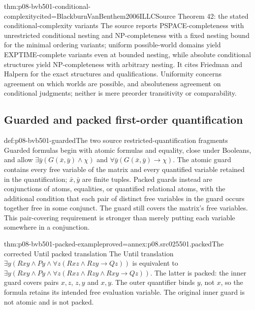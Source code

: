 \begin{hbtheorem}{thm:p08-bvb501-conditional-complexity}{cited=BlackburnVanBenthem2006ILLC}{Source Theorem 42: the stated conditional-complexity variants}
The source reports PSPACE-completeness with unrestricted conditional
nesting and NP-completeness with a fixed nesting bound for the minimal
ordering variants; uniform possible-world domains yield EXPTIME-complete
variants even at bounded nesting, while absolute conditional structures
yield NP-completeness with arbitrary nesting. It cites Friedman and Halpern
for the exact structures and qualifications. Uniformity concerns agreement
on which worlds are possible, and absoluteness agreement on conditional
judgments; neither is mere preorder transitivity or comparability.
\end{hbtheorem}

\subsection{Guarded and packed first-order quantification}
\label{sec:p08-bvb501-guarded}

\begin{hbdefinition}{def:p08-bvb501-guarded}{The two source restricted-quantification fragments}
Guarded formulas begin with atomic formulas and equality, close under
Booleans, and allow \(\exists\bar y(G(\bar x,\bar y)\land\chi)\)
and \(\forall\bar y(G(\bar x,\bar y)\to\chi)\).
The atomic guard contains every free variable of the matrix and every
quantified variable retained in the quantification; \(\bar x,\bar y\)
are finite tuples. Packed guards instead are conjunctions of atoms,
equalities, or quantified relational atoms, with the additional condition
that each pair of distinct free variables in the guard occurs together
free in some conjunct. The guard still covers the matrix's free variables.
This pair-covering requirement is stronger than merely putting each
variable somewhere in a conjunction.
\end{hbdefinition}

\begin{hbtheorem}{thm:p08-bvb501-packed-example}{proved=annex:p08.src025501.packed}{The corrected Until packed translation}
The Until translation
\(\exists y(Rxy\land Py\land\forall z(Rxz\land Rzy\to Qz))\)
is equivalent to
\(\exists y(Rxy\land Py\land
\forall z(Rxz\land Rzy\land Rxy\to Qz))\).
The latter is packed: the inner guard covers pairs \(x,z\),
\(z,y\) and \(x,y\). The outer quantifier binds \(y\),
not \(x\), so the formula retains its intended free evaluation variable.
The original inner guard is not atomic and is not packed.
\end{hbtheorem}

